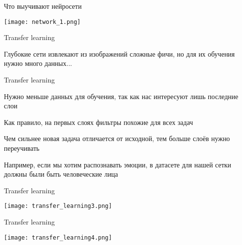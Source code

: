 \documentclass[notes,12pt, aspectratio=169]{beamer}
\newenvironment{wideitemize}{\itemize\addtolength{\itemsep}{10pt}}{\enditemize}
\begin{document}
\begin{frame}{Что выучивают нейросети}
\begin{center}
	\texttt{[image: network\_1.png]}
\end{center}
\end{frame}


\begin{frame}{Transfer learning}
\begin{wideitemize}
\item  Глубокие сети извлекают из изображений сложные фичи, но для их обучения нужно много данных...
\end{wideitemize}


\end{frame}


\begin{frame}{Transfer learning}
\begin{wideitemize}
	\item  Нужно меньше данных для обучения, так как нас интересуют лишь последние слои
	\item  Как правило, на первых слоях фильтры похожие для всех задач
	\item  Чем сильнее новая задача отличается от исходной, тем больше слоёв нужно переучивать
	\item  Например, если мы хотим распознавать эмоции, в датасете для нашей сетки должны были быть человеческие лица
\end{wideitemize}
\end{frame}


\begin{frame}{Transfer learning}
\begin{center}
\texttt{[image: transfer\_learning3.png]}
\end{center}
\end{frame}


\begin{frame}{Transfer learning}
\begin{center}
\texttt{[image: transfer\_learning4.png]}
\end{center}
\end{frame}
\end{document}
